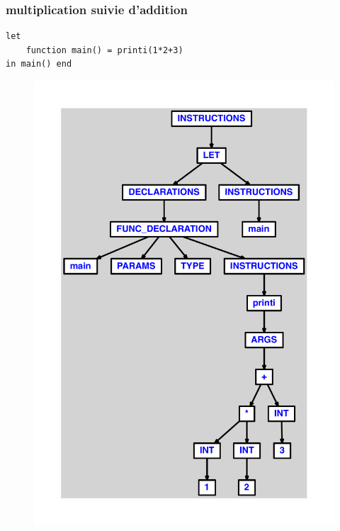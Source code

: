 \documentclass{article}
\begin{document}
\subsubsection{multiplication suivie d'addition}
\begin{lstlisting}
let
	function main() = printi(1*2+3)
in main() end
\end{lstlisting}
\newpage
\begin{figure}[H]
\centering
\includegraphics[max width=\textwidth]{ast/ast_47.pdf}
\end{figure}
\newpage
\end{document}
